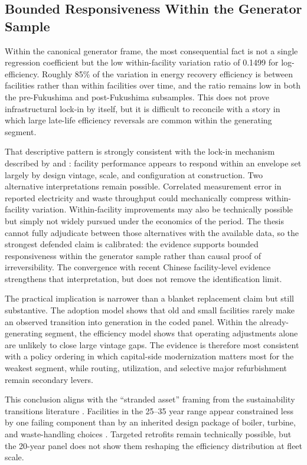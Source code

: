 \documentclass[12pt,a4paper]{article}
\begin{document}
\subsection{Bounded Responsiveness Within the Generator Sample}

Within the canonical generator frame, the most consequential fact is not a single regression coefficient but the low within-facility variation ratio of 0.1499 for log-efficiency. Roughly 85\% of the variation in energy recovery efficiency is between facilities rather than within facilities over time, and the ratio remains low in both the pre-Fukushima and post-Fukushima subsamples. This does not prove infrastructural lock-in by itself, but it is difficult to reconcile with a story in which large late-life efficiency reversals are common within the generating segment.

That descriptive pattern is strongly consistent with the lock-in mechanism described by \citet{Unruh2000} and \citet{Seto2016}: facility performance appears to respond within an envelope set largely by design vintage, scale, and configuration at construction. Two alternative interpretations remain possible. Correlated measurement error in reported electricity and waste throughput could mechanically compress within-facility variation. Within-facility improvements may also be technically possible but simply not widely pursued under the economics of the period. The thesis cannot fully adjudicate between those alternatives with the available data, so the strongest defended claim is calibrated: the evidence supports bounded responsiveness within the generator sample rather than causal proof of irreversibility. The convergence with recent Chinese facility-level evidence \citep{Cui2026} strengthens that interpretation, but does not remove the identification limit.

The practical implication is narrower than a blanket replacement claim but still substantive. The adoption model shows that old and small facilities rarely make an observed transition into generation in the coded panel. Within the already-generating segment, the efficiency model shows that operating adjustments alone are unlikely to close large vintage gaps. The evidence is therefore most consistent with a policy ordering in which capital-side modernization matters most for the weakest segment, while routing, utilization, and selective major refurbishment remain secondary levers.

This conclusion aligns with the ``stranded asset'' framing from the sustainability transitions literature \citep{Caldecott2016}. Facilities in the 25--35 year range appear constrained less by one failing component than by an inherited design package of boiler, turbine, and waste-handling choices \citep{Niessen2010}. Targeted retrofits remain technically possible, but the 20-year panel does not show them reshaping the efficiency distribution at fleet scale.
\end{document}
